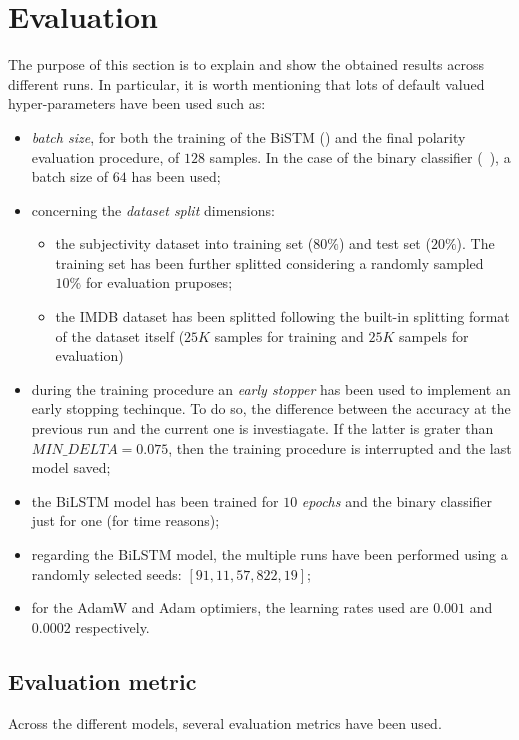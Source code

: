 
\section{Evaluation}
\label{sec:eval}
The purpose of this section is to explain and show the obtained results across different runs. In particular, it is worth mentioning that
lots of default valued hyper-parameters have been used such as:
\begin{itemize}
    \item \textit{batch size}, for both the training of the BiSTM () and the final polarity evaluation procedure, of $128$
        samples. In the case of the binary classifier (~\cite{sequence}), a batch size of $64$ has been used;
    \item concerning the \textit{dataset split} dimensions:
        \begin{itemize}
            \item the subjectivity dataset into training set ($80\%$) and test set ($20\%$). The training set has been further splitted 
            considering a randomly sampled $10\%$ for evaluation pruposes;
            \item the IMDB dataset has been splitted following the built-in splitting format of the dataset itself ($25K$ samples for training
            and $25K$ sampels for evaluation)
        \end{itemize}
    \item during the training procedure an \textit{early stopper} has been used to implement an early stopping techinque. To do so, the 
        difference between the accuracy at the previous run and the current one is investiagate. If the latter is grater than $MIN\_DELTA=0.075$, 
        then the training procedure is interrupted and the last model saved;
    \item the BiLSTM model has been trained for $10$ \textit{epochs} and the binary classifier just for one (for time reasons);
    \item regarding the BiLSTM model, the multiple runs have been performed using a randomly selected seeds: $[91, 11, 57, 822, 19]$;
    \item for the AdamW and Adam optimiers, the learning rates used are $0.001$ and $0.0002$ respectively. 
\end{itemize}


\subsection{Evaluation metric}
\label{subsec:metric}
Across the different models, several evaluation metrics have been used. 
